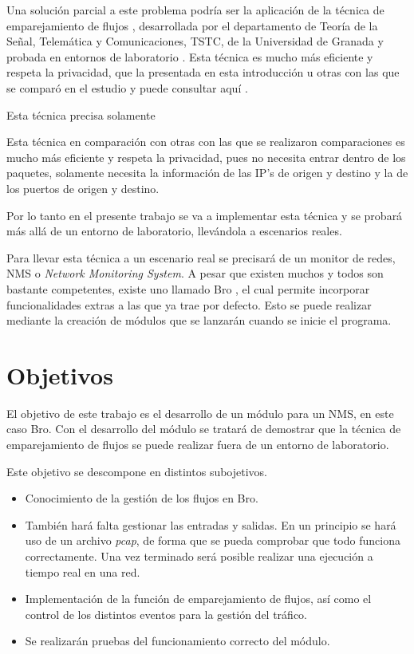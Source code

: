 \intro Una solución parcial a este problema podría ser la aplicación de la técnica de emparejamiento de flujos \cite{presentacion}, 
desarrollada por el departamento de Teoría de la Señal, Telemática y Comunicaciones, TSTC, de la Universidad de Granada y probada en 
entornos de laboratorio \cite{comparacion}. Esta técnica es mucho más eficiente y respeta la privacidad, que la presentada en esta 
introducción u otras con las que se comparó en el estudio y puede consultar aquí \cite{iana} \cite{payload} \cite{learning}.

\intro Esta técnica precisa solamente 


Esta técnica en comparación con otras con las que se realizaron comparaciones es mucho más eficiente y respeta la privacidad, 
pues no necesita entrar dentro de los paquetes, solamente necesita la información de las IP's de origen y destino y la de los 
puertos de origen y destino.

\intro Por lo tanto en el presente trabajo se va a implementar esta técnica y se probará más allá de un entorno de laboratorio, 
llevándola a escenarios reales.

\intro Para llevar esta técnica a un escenario real se precisará de un monitor de redes, NMS o \textit{Network Monitoring System}. 
A pesar que existen muchos y todos son bastante competentes, existe uno llamado Bro \cite{broindex}, el cual permite 
incorporar funcionalidades extras a las que ya trae por defecto. Esto se puede realizar mediante la creación de módulos que se 
lanzarán cuando se inicie el programa.

\section{Objetivos}

El objetivo de este trabajo es el desarrollo de un módulo para un NMS, en este caso Bro. Con el desarrollo del módulo se tratará 
de demostrar que la técnica de emparejamiento de flujos se puede realizar fuera de un entorno de laboratorio.

\intro Este objetivo se descompone en distintos subojetivos.

\begin{itemize}
\item Conocimiento de la gestión de los flujos en Bro.
\item También hará falta gestionar las entradas y salidas. En un principio se hará uso de un archivo \textit{pcap}, de forma 
que se pueda comprobar que todo funciona correctamente. Una vez terminado será posible realizar una ejecución a tiempo real en una 
red.
\item Implementación de la función de emparejamiento de flujos, así como el control de los distintos eventos para la gestión del 
tráfico.
\item Se realizarán pruebas del funcionamiento correcto del módulo.
\end{itemize}

